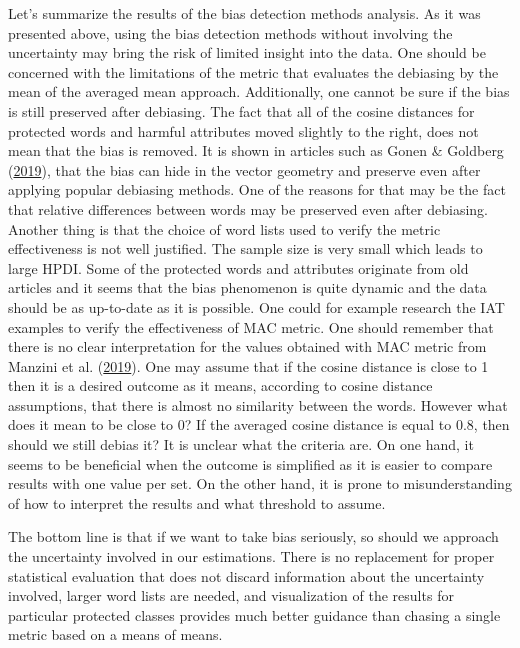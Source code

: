 \documentclass[12pt,]{book}
\begin{document}
Let's summarize the results of the bias detection methods analysis. As
it was presented above, using the bias detection methods without
involving the uncertainty may bring the risk of limited insight into the
data. One should be concerned with the limitations of the metric that
evaluates the debiasing by the mean of the averaged mean approach.
Additionally, one cannot be sure if the bias is still preserved after
debiasing. The fact that all of the cosine distances for protected words
and harmful attributes moved slightly to the right, does not mean that
the bias is removed. It is shown in articles such as Gonen \& Goldberg
(\protect\hyperlink{ref-Gonen2019Lipstick}{2019}), that the bias can
hide in the vector geometry and preserve even after applying popular
debiasing methods. One of the reasons for that may be the fact that
relative differences between words may be preserved even after
debiasing. Another thing is that the choice of word lists used to verify
the metric effectiveness is not well justified. The sample size is very
small which leads to large HPDI. Some of the protected words and
attributes originate from old articles and it seems that the bias
phenomenon is quite dynamic and the data should be as up-to-date as it
is possible. One could for example research the IAT examples to verify
the effectiveness of MAC metric. One should remember that there is no
clear interpretation for the values obtained with MAC metric from
Manzini et al.
(\protect\hyperlink{ref-Manzini2019blackToCriminal}{2019}). One may
assume that if the cosine distance is close to 1 then it is a desired
outcome as it means, according to cosine distance assumptions, that
there is almost no similarity between the words. However what does it
mean to be close to 0? If the averaged cosine distance is equal to 0.8,
then should we still debias it? It is unclear what the criteria are. On
one hand, it seems to be beneficial when the outcome is simplified as it
is easier to compare results with one value per set. On the other hand,
it is prone to misunderstanding of how to interpret the results and what
threshold to assume.

The bottom line is that if we want to take bias seriously, so should we
approach the uncertainty involved in our estimations. There is no
replacement for proper statistical evaluation that does not discard
information about the uncertainty involved, larger word lists are
needed, and visualization of the results for particular protected
classes provides much better guidance than chasing a single metric based
on a means of means.
\end{document}
